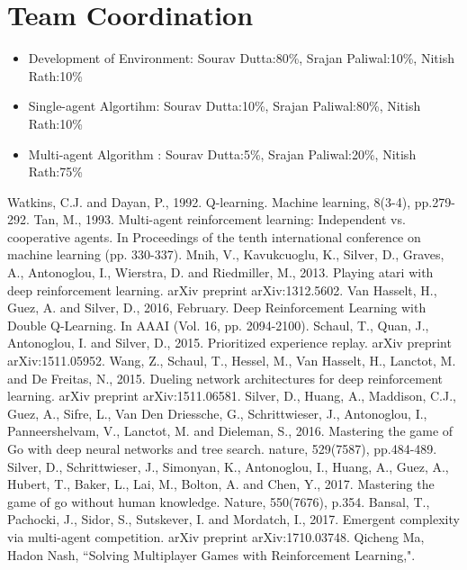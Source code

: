 \documentclass[conference,10pt]{IEEEtran}
\begin{document}
\section{Team Coordination}
\begin{itemize}

	\item Development of Environment: Sourav Dutta:80\%, Srajan Paliwal:10\%, Nitish Rath:10\%
	\item Single-agent Algortihm: Sourav Dutta:10\%, Srajan Paliwal:80\%, Nitish Rath:10\%
\item	Multi-agent Algorithm : Sourav Dutta:5\%, Srajan Paliwal:20\%, Nitish Rath:75\%  

\end{itemize}
\begin{thebibliography}{00}
 Watkins, C.J. and Dayan, P., 1992. Q-learning. Machine learning, 8(3-4), pp.279-292.
 Tan, M., 1993. Multi-agent reinforcement learning: Independent vs. cooperative agents. In Proceedings of the tenth international conference on machine learning (pp. 330-337).
 Mnih, V., Kavukcuoglu, K., Silver, D., Graves, A., Antonoglou, I., Wierstra, D. and Riedmiller, M., 2013. Playing atari with deep reinforcement learning. arXiv preprint arXiv:1312.5602.
 Van Hasselt, H., Guez, A. and Silver, D., 2016, February. Deep Reinforcement Learning with Double Q-Learning. In AAAI (Vol. 16, pp. 2094-2100).
 Schaul, T., Quan, J., Antonoglou, I. and Silver, D., 2015. Prioritized experience replay. arXiv preprint arXiv:1511.05952.
 Wang, Z., Schaul, T., Hessel, M., Van Hasselt, H., Lanctot, M. and De Freitas, N., 2015. Dueling network architectures for deep reinforcement learning. arXiv preprint arXiv:1511.06581.
 Silver, D., Huang, A., Maddison, C.J., Guez, A., Sifre, L., Van Den Driessche, G., Schrittwieser, J., Antonoglou, I., Panneershelvam, V., Lanctot, M. and Dieleman, S., 2016. Mastering the game of Go with deep neural networks and tree search. nature, 529(7587), pp.484-489.
 Silver, D., Schrittwieser, J., Simonyan, K., Antonoglou, I., Huang, A., Guez, A., Hubert, T., Baker, L., Lai, M., Bolton, A. and Chen, Y., 2017. Mastering the game of go without human knowledge. Nature, 550(7676), p.354.
 Bansal, T., Pachocki, J., Sidor, S., Sutskever, I. and Mordatch, I., 2017. Emergent complexity via multi-agent competition. arXiv preprint arXiv:1710.03748.
 Qicheng Ma, Hadon Nash, ``Solving Multiplayer Games with Reinforcement Learning,".

\end{thebibliography}
\end{document}
